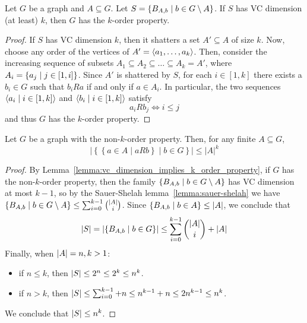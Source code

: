     \lemma\label{lemma:vc_dimension_implies_k_order_property}
        Let $G$ be a graph and $A \subseteq G$.
        Let $S = \left\{ B_{A,b} \mid b \in G \setminus A \right\}$.
        If $S$ has VC dimension (at least) $k$, then $G$ has the $k$-order property.
        \begin{proof}
            If $S$ has VC dimension $k$, then it shatters a set $A' \subseteq A$ of size $k$.
            Now, choose any order of the vertices of $A' = \left< a_1, \dots, a_k \right>$.
            Then, consider the increasing sequence of subsets $A_1 \subseteq A_2 \subseteq \dots \subseteq A_k = A'$,
            where $A_i = \left\{ a_j \mid j \in [1,i] \right\}$.
            Since $A'$ is shattered by $S$, for each $i \in [1,k]$ there exists a $b_i \in G$ such that
            $b_i R a$ if and only if $a \in A_i$.
            In particular, the two sequences $\left< a_i \mid i \in [1,k] \right>$ and $\left< b_i \mid i \in [1,k] \right>$
            satisfy
            \[
                a_i R b_j \Leftrightarrow i \leq j
            \]
            and thus $G$ has the $k$-order property.
        \end{proof}

    \lemma[Claim 2.6]\label{claim_2.6}
        Let $G$ be a graph with the non-$k$-order property.
        Then, for any finite $A \subseteq G$,
        $$
            \left|\left\{ \left\{ a \in A \mid a R b \right\} \mid b \in G \right\} \right| \leq |A|^k
        $$
        \begin{proof}
            By Lemma~\ref{lemma:vc_dimension_implies_k_order_property}, if $G$ has the non-$k$-order property,
            then the family $\left\{ B_{A,b} \mid b \in G \setminus A \right\}$ has VC dimension at most $k-1$,
            so by the Sauer-Shelah lemma~\ref{lemma:sauer-shelah} we have
            $\left\{ B_{A,b} \mid b \in G \setminus A \right\} \leq \sum_{i=0}^{k-1} \binom{|A|}{i}$.
            Since $\left\{ B_{A,b} \mid b \in A \right\} \leq \left| A \right|$, we conclude that
            \[
                \left| S \right| = \left| \left\{ B_{A,b} \mid b \in G \right\} \right| \leq \sum_{i=0}^{k-1} \binom{|A|}{i} + |A|
            \]
            Finally, when $\left| A \right| = n,k > 1$: 
            \begin{itemize}
                \item if $n \leq k$, then $\left| S \right| \leq 2^n \leq 2^k \leq n^k$.
                \item if $n > k$, then $\left| S \right| \leq \sum_{i=0}^{k-1} + n \leq n^{k-1} + n \leq 2n^{k-1} \leq n^k$.
            \end{itemize}
            We conclude that $\left| S \right| \leq n^k$.
        \end{proof}


